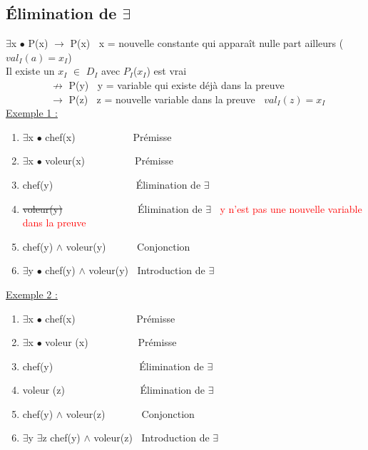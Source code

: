\begin{flushleft}
\section{Élimination de $\exists$}
$\exists$x $\bullet$ P(x) $\rightarrow$ P(x) $\>$ x = nouvelle constante qui apparaît nulle part ailleurs ($val_{I}(a) = x_{I}$)\\
Il existe un $x_{I}$ $\in$ $D_{I}$ avec $P_{I}$($x_{I}$) est vrai\\
$\>$ $\>$ $\>$ $\>$ $\>$ $\>$ $\>$ $\>$ $\nrightarrow$ P(y) $\>$ y = variable qui existe d\'ej\`a dans la preuve \\
$\>$ $\>$ $\>$ $\>$ $\>$ $\>$ $\>$ $\>$ $\rightarrow$ P(z) $\>$ z = nouvelle variable dans la preuve $\>$ $val_{I}(z) = x_{I}$\\
\underline{Exemple 1 :}\\
\begin{enumerate}
\item $\exists$x $\bullet$ chef(x) $\>$ $\>$ $\>$ $\>$ $\>$ $\>$ $\>$ $\>$ $\>$ $\>\>$Pr\'emisse
\item $\exists$x $\bullet$ voleur(x) $\>$ $\>$ $\>$ $\>$ $\>$ $\>$ $\>$ $\>$  $\>$Pr\'emisse
\item chef(y) $\>$ $\>$ $\>$ $\>$ $\>$ $\>$ $\>$ $\>$ $\>$ $\>$ $\>$ $\>$ $\>$ $\>$ $\>$Élimination de $\exists$
\item \sout{voleur(y)} $\>$ $\>$ $\>$ $\>$ $\>$ $\>$ $\>$ $\>$ $\>$ $\>$ $\>$ $\>$ $\>$ Élimination de $\exists$ $\>$ \textcolor{red}{y n'est pas une nouvelle variable dans la preuve}
\item chef(y) $\wedge$ voleur(y) $\>$ $\>$ $\>$ $\>$ $\>$ Conjonction
\item $\exists$y $\bullet$ chef(y) $\wedge$ voleur(y) $\>$ Introduction de $\exists$
\end{enumerate}

\underline{Exemple 2 :}\\
\begin{enumerate}
\item $\exists$x $\bullet$ chef(x) $\>$ $\>$ $\>$ $\>$ $\>$ $\>$ $\>$ $\>$ $\>$ $\>$ $\>$Pr\'emisse
\item $\exists$x $\bullet$ voleur (x) $\>$ $\>$ $\>$ $\>$ $\>$ $\>$ $\>$ $\>$ $\>$Pr\'emisse
\item chef(y) $\>$ $\>$ $\>$ $\>$ $\>$ $\>$ $\>$ $\>$ $\>$ $\>$ $\>$ $\>$ $\>$ $\>$ $\>$ Élimination de $\exists$
\item voleur (z) $\>$ $\>$ $\>$ $\>$ $\>$ $\>$ $\>$ $\>$ $\>$ $\>$ $\>$ $\>$ $\>$ Élimination de $\exists$
\item chef(y) $\wedge$ voleur(z) $\>$ $\>$ $\>$ $\>$ $\>$ $\>$ Conjonction
\item $\exists$y $\exists$z chef(y) $\wedge$ voleur(z) $\>$ Introduction de $\exists$
\end{enumerate}


\end{flushleft}
